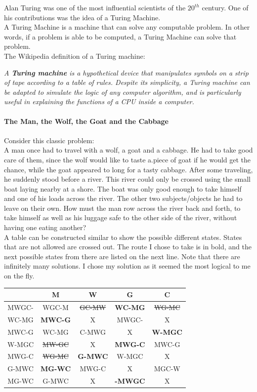 \documentclass{scrartcl}
\begin{document}
Alan Turing was one of the most influential scientists of the $20^{th}$ century. One of his contributions was the idea of a Turing Machine.\\

A Turing Machine is a machine that can solve any computable problem. In other words, if a problem is able to be computed, a Turing Machine can solve that problem.\\

The Wikipedia definition of a Turing machine:

 \emph{A \textbf{Turing machine} is a hypothetical device that manipulates symbols on a strip of tape according to a table of rules. Despite its simplicity, a Turing machine can be adapted to simulate the logic of any computer algorithm, and is particularly useful in explaining the functions of a CPU inside a computer.}\\\\
\textbf{The Man, the Wolf, the Goat and the Cabbage}\\\\
Consider this classic problem:\\

A man once had to travel with a wolf, a goat and a cabbage. He had to take good care of them, since the wolf would like to taste a.piece of goat if he would get the chance, while the goat appeared to long for a tasty cabbage. After some traveling, he suddenly stood before a river. This river could only be crossed using the small boat laying nearby at a shore. The boat was only good enough to take himself and one of his loads across the river. The other two subjects/objects he had to leave on their own. How must the man row across the river back and forth, to take himself as well as his luggage safe to the other side of the river, without having one eating another? \\

A table can be constructed similar to show the possible different states. States that are not allowed are crossed out. The route I chose to take is in bold, and the next possible states from there are listed on the next line. Note that there are infinitely many solutions. I chose my solution as it seemed the most logical to me on the fly.

\begin{center}
\begin{tabular} { |c|c c c c| }
\hline
&M&W&G&C\\
\hline
MWGC-&WGC-M&\sout{GC-MW}&\textbf{WC-MG}&\sout{WG-MC}\\
WC-MG&\textbf{MWC-G}&X&MWGC-&X\\
MWC-G&WC-MG&C-MWG&X&\textbf{W-MGC}\\
W-MGC&\sout{MW-GC}&X&\textbf{MWG-C}&MWC-G\\
MWG-C&\sout{WG-MC}&\textbf{G-MWC}&W-MGC&X\\
G-MWC&\textbf{MG-WC}&MWG-C&X&MGC-W\\
MG-WC&G-MWC&X&\textbf{-MWGC}&X\\
\hline
\end{tabular}
\end{center}\pagebreak
\end{document}
